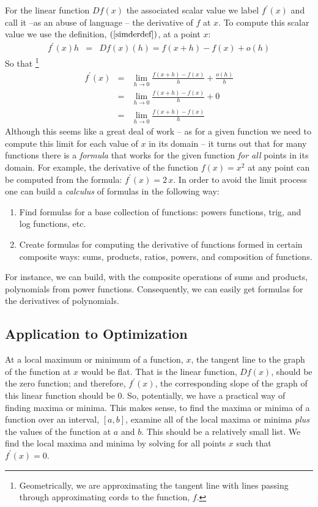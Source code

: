 \documentclass{article}
\begin{document}
For the linear function $Df(x)$ the associated scalar value we label $f^\prime(x)$
and call it --as an abuse of language -- the derivative of $f$ at $x$.
To compute this scalar value we use the definition, $(\ref{simderdef})$, at a point $x$:
\begin{eqnarray}
  f^\prime(x) h & = & Df(x)(h) = f(x+h) - f(x) + o(h)
\end{eqnarray}
So that%
\footnote{Geometrically, we are approximating the tangent line with lines passing
through approximating cords to the function, $f$.}
\begin{eqnarray}
  f^\prime(x) & = & \lim_{h \rightarrow 0} \frac{f(x+h) - f(x)}{h} + \frac{o(h)}{h} \nonumber \\
  & = & \lim_{h \rightarrow 0} \frac{f(x+h) - f(x)}{h} + 0 \nonumber \\
  & = & \lim_{h \rightarrow 0} \frac{f(x+h) - f(x)}{h}
\end{eqnarray}
Although this seems like a great deal of work -- as for a given function we need to
compute this limit for each value of $x$ in its domain -- it turns out that for
many functions there is a {\em formula\/} that works for the given function
{\em for all\/}
points in its domain. For example, the derivative of the
function $f(x) = x^2$ at any point can be computed from the formula:
$f^\prime(x) = 2\, x$. In order to avoid the limit process one can build a
{\em calculus\/} of formulas in the following way:
\begin{enumerate}
\item{Find formulas for a base collection of functions: powers functions, trig, and log
functions, etc.}
\item{Create formulas for computing the derivative of functions formed in certain
composite ways: sums, products, ratios, powers, and composition of functions.}
\end{enumerate}
For instance, we can build, with the composite operations of sums and products,
polynomials from power functions. Consequently, we can easily get formulas 
for the derivatives of polynomials.

\subsection{Application to Optimization}
At a local maximum or minimum of a function, $x$, the tangent line to
the graph of the function at $x$ would be flat. That is the linear function, $Df(x)$,
should be the zero function; and therefore, $f^\prime(x)$, the corresponding
slope of the graph of this linear function should be $0$.
So, potentially, we have a practical way of finding maxima or minima.
This makes sense, to find the maxima or minima of a function over an interval, $[a,b]$,
examine all of the local maxima or minima {\em plus\/} the values of the function
at $a$ and $b$. This should be a relatively small list. We find the local maxima
and minima by solving for all points $x$ such that $f^\prime(x) = 0$.
\end{document}

